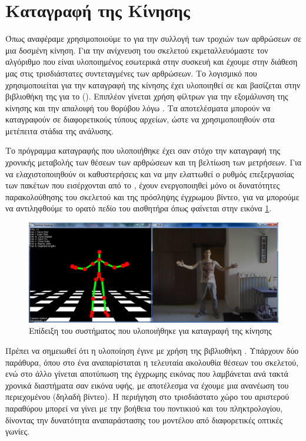 \section{Καταγραφή της Κίνησης}

Όπως αναφέραμε χρησιμοποιούμε το  για την συλλογή των τροχιών των αρθρώσεων σε μια δοσμένη κίνηση. Για την ανίχνευση του σκελετού εκμεταλλευόμαστε τον αλγόριθμο που είναι υλοποιημένος εσωτερικά στην συσκευή και έχουμε στην διάθεση μας στις τρισδιάστατες συντεταγμένες των αρθρώσεων. Το λογισμικό που χρησιμοποιείται για την καταγραφή της κίνησης έχει υλοποιηθεί σε  και βασίζεται στην βιβλιοθήκη της  για το  (). Επιπλέον γίνεται χρήση φίλτρων για την εξομάλυνση της κίνησης και την απαλοιφή του θορύβου λόγω . Τα αποτελέσματα μπορούν να καταγραφούν σε διαφορετικούς τύπους αρχείων, ώστε να χρησιμοποιηθούν στα μετέπειτα στάδια της ανάλυσης.

Το πρόγραμμα καταγραφής που υλοποιήθηκε έχει σαν στόχο την καταγραφή της χρονικής μεταβολής των θέσεων των αρθρώσεων και τη βελτίωση των μετρήσεων. Για να ελαχιστοποιηθούν οι καθυστερήσεις και να μην ελαττωθεί ο ρυθμός επεξεργασίας των πακέτων που εισέρχονται από το , έχουν ενεργοποιηθεί μόνο οι δυνατότητες παρακολούθησης του σκελετού και της πρόσληψης έγχρωμου βίντεο, για να μπορούμε να αντιληφθούμε το ορατό πεδίο του αισθητήρα όπως φαίνεται στην εικόνα \ref{fig:motion-capture}.

\begin{figure}[H]
    \centering
    \includegraphics[width=.9\textwidth, keepaspectratio]{fig/motion-capture.png}
    \caption{Επίδειξη του συστήματος που υλοποιήθηκε για καταγραφή της κίνησης}
    \label{fig:motion-capture}
\end{figure}

Πρέπει να σημειωθεί ότι η υλοποίηση έγινε με χρήση της βιβλιοθήκη . Υπάρχουν δύο παράθυρα, όπου στο ένα αναπαρίσταται η τελευταία ακολουθία θέσεων του σκελετού, ενώ στο άλλο γίνεται αποτύπωση της έγχρωμης εικόνας που λαμβάνεται ανά τακτά χρονικά διαστήματα σαν εικόνα υφής, με αποτέλεσμα να έχουμε μια ανανέωση του περιεχομένου (δηλαδή βίντεο). Η περιήγηση στο τρισδιάστατο χώρο του αριστερού παραθύρου μπορεί να γίνει με την βοήθεια του ποντικιού και του πληκτρολογίου, δίνοντας την δυνατότητα αναπαράστασης του μοντέλου από διαφορετικές οπτικές γωνίες.

